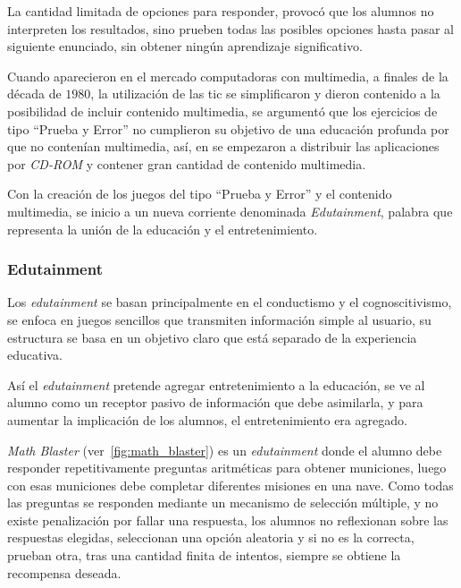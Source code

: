 La cantidad limitada de opciones para responder, provocó que los alumnos no
interpreten los resultados, sino prueben todas las posibles opciones hasta
pasar al siguiente enunciado, sin obtener ningún aprendizaje
significativo\cite{leinonen:ict}.

Cuando aparecieron en el mercado computadoras con multimedia, a finales de la
década de $1980$, la utilización de las \Gls{tic} se simplificaron y dieron
contenido a la posibilidad de incluir contenido multimedia, se argumentó que los
ejercicios de tipo \enquote{Prueba y Error} no cumplieron su objetivo de una
educación profunda por que no contenían multimedia\cite{leinonen:ict}, así, en
se empezaron a distribuir las aplicaciones por \textit{CD-ROM} y contener gran
cantidad de contenido multimedia.

Con la creación de los juegos del tipo \enquote{Prueba y Error} y el contenido
multimedia, se inicio a un nueva corriente denominada \emph{Edutainment},
palabra que representa la unión de la educación y el entretenimiento. 

\subsubsection{Edutainment}

Los \emph{edutainment} se basan principalmente en el conductismo y el
cognoscitivismo, se enfoca en juegos sencillos que transmiten información simple
al usuario, su estructura se basa en un objetivo claro que está separado de la
experiencia educativa\cite{egenfeldt2007third}. 

Así el \emph{edutainment} pretende agregar entretenimiento a la educación, se
ve al alumno como un receptor pasivo de información que debe asimilarla, y para
aumentar la implicación de los alumnos, el entretenimiento era
agregado\cite{resnick:2004}.

\emph{Math Blaster} (ver~\ref{fig:math_blaster}) es un \emph{edutainment} donde
el alumno debe responder repetitivamente preguntas aritméticas para obtener
municiones, luego con esas municiones debe completar diferentes misiones en una
nave\cite{bruckman1999can}. Como todas las preguntas se responden mediante un
mecanismo de selección múltiple, y no existe penalización por fallar una
respuesta, los alumnos no reflexionan sobre las respuestas elegidas, seleccionan
una opción aleatoria y si no es la correcta, prueban otra, tras una cantidad
finita de intentos, siempre se obtiene la recompensa deseada.

